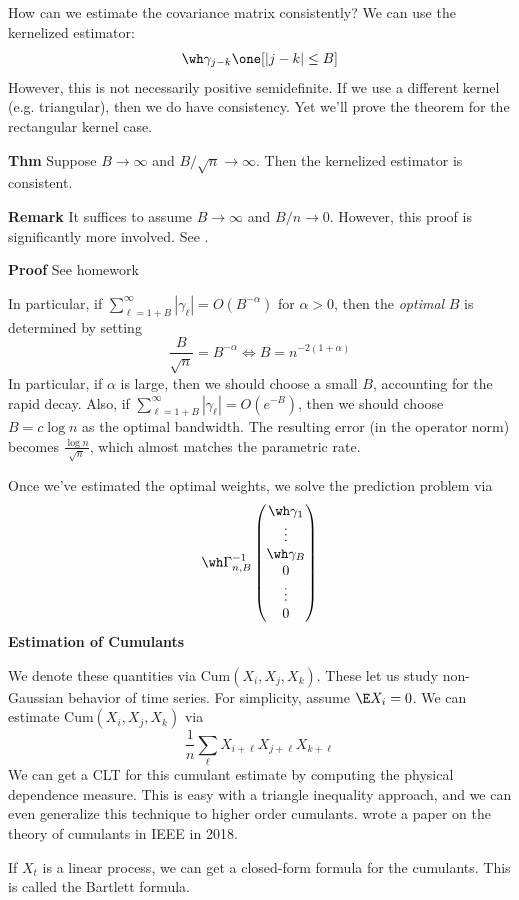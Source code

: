 How can we estimate the covariance matrix consistently? We can use the kernelized estimator:
\[\wh \gamma_{j-k} \one[|j - k| \leq B]\]
However, this is not necessarily positive semidefinite. If we use a different kernel (e.g. triangular), then we do have consistency. Yet we'll prove the theorem for the rectangular kernel case.

\textbf{Thm} Suppose \(B \to \infty\) and \(B/\sqrt n \to \infty\). Then the kernelized estimator is consistent.

\textbf{Remark} It suffices to assume \(B \to \infty\) and \(B/n \to 0\). However, this proof is significantly more involved. See \citet{XW12}.

\textbf{Proof} See homework

In particular, if \(\sum_{\ell = 1 + B}^\infty |\gamma_\ell| = O(B^{-\alpha})\) for \(\alpha > 0\), then the \emph{optimal} \(B\) is determined by setting
\[\frac{B}{\sqrt n} = B^{-\alpha} \iff B = n^{-2(1 + \alpha)}\]
In particular, if \(\alpha\) is large, then we should choose a small \(B\), accounting for the rapid decay. Also, if \(\sum_{\ell = 1 + B}^\infty |\gamma_\ell| = O(e^{-B})\), then we should choose \(B = c \log n\) as the optimal bandwidth. The resulting error (in the operator norm) becomes \(\frac{\log n}{\sqrt n}\), which almost matches the parametric rate.

Once we've estimated the optimal weights, we solve the prediction problem via
\[\wh \Gamma_{n,B}^{-1}
\begin{pmatrix}
\wh \gamma_1 \\
\vdots \\
\wh \gamma_B \\
0 \\
\vdots \\
0
\end{pmatrix}\]
\textbf{Estimation of Cumulants}

We denote these quantities via \(\text{Cum}(X_i, X_j, X_k)\). These let us study non-Gaussian behavior of time series. For simplicity, assume \(\E X_i = 0\). We can estimate \(\text{Cum}(X_i, X_j, X_k)\) via
\[\frac{1}{n} \sum_\ell X_{i + \ell} X_{j + \ell} X_{k + \ell}\]
We can get a CLT for this cumulant estimate by computing the physical dependence measure. This is easy with a triangle inequality approach, and we can even generalize this technique to higher order cumulants. \citet{ZW18} wrote a paper on the theory of cumulants in IEEE in 2018.

If \(X_t\) is a linear process, we can get a closed-form formula for the cumulants. This is called the Bartlett formula.

